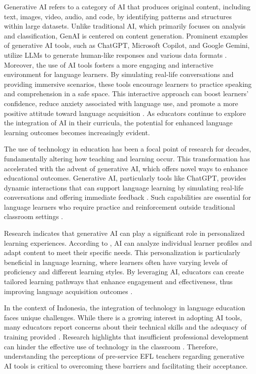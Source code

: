 \documentclass[english]{textolivre}
\begin{document}
Generative AI refers to a category of AI that produces original content, including text, images, video, audio, and code, by identifying patterns and structures within large datasets. Unlike traditional AI, which primarily focuses on analysis and classification, GenAI is centered on content generation. Prominent examples of generative AI tools, such as ChatGPT, Microsoft Copilot, and Google Gemini, utilize LLMs to generate human-like responses and various data formats \cite{CromptonBurke2023AIHigherEducation}. Moreover, the use of AI tools fosters a more engaging and interactive environment for language learners. By simulating real-life conversations and providing immersive scenarios, these tools encourage learners to practice speaking and comprehension in a safe space. This interactive approach can boost learners’ confidence, reduce anxiety associated with language use, and promote a more positive attitude toward language acquisition \cite{HuangPengTeo2025AIAffordances}. As educators continue to explore the integration of AI in their curricula, the potential for enhanced language learning outcomes becomes increasingly evident.

The use of technology in education has been a focal point of research for decades, fundamentally altering how teaching and learning occur. This transformation has accelerated with the advent of generative AI, which offers novel ways to enhance educational outcomes. Generative AI, particularly tools like ChatGPT, provides dynamic interactions that can support language learning by simulating real-life conversations and offering immediate feedback \cite{WangDuZou2025MultimodalAI}. Such capabilities are essential for language learners who require practice and reinforcement outside traditional classroom settings \cite{ChugaiLytovchenkoSynekop2025ChatGPTESL}.

Research indicates that generative AI can play a significant role in personalized learning experiences. According to \textcite{Sumakul2025L2MotivationAI}, AI can analyze individual learner profiles and adapt content to meet their specific needs. This personalization is particularly beneficial in language learning, where learners often have varying levels of proficiency and different learning styles. By leveraging AI, educators can create tailored learning pathways that enhance engagement and effectiveness, thus improving language acquisition outcomes \cite{GirayEtAl2025ChatGPTTAM}.

In the context of Indonesia, the integration of technology in language education faces unique challenges. While there is a growing interest in adopting AI tools, many educators report concerns about their technical skills and the adequacy of training provided \cite{SariSulistyo2022MALL}. Research highlights that insufficient professional development can hinder the effective use of technology in the classroom \cite{DogruOzen2023SelfDirectedLearning}. Therefore, understanding the perceptions of pre-service EFL teachers regarding generative AI tools is critical to overcoming these barriers and facilitating their acceptance.
\end{document}
